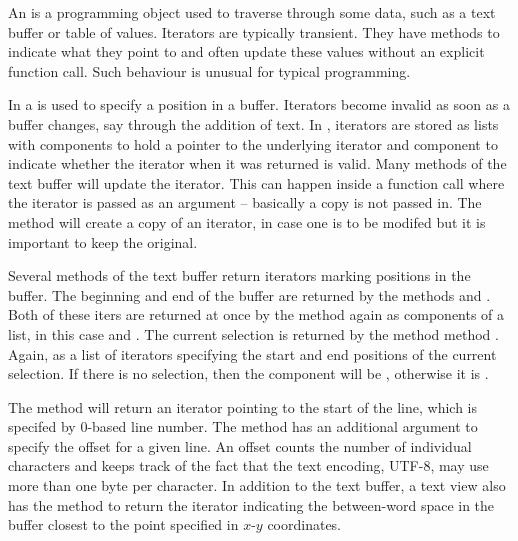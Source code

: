 An  is a programming object used to traverse through
some data, such as a text buffer or table of values. Iterators are
typically transient. They have
methods to indicate what they point to and often update these
values without an explicit function call. Such behaviour is unusual
for typical \R\/ programming.


In \GTK{} a  is used to specify a position in a
buffer. Iterators become invalid as soon as a buffer changes, say
through the addition of text.  In , iterators are stored as
lists with components  to hold a pointer to the underlying
iterator and component  to indicate whether the iterator
when it was returned is valid. Many methods of the text buffer will
update the iterator. This can happen inside a function call where the
iterator is passed as an argument -- basically a copy is not passed
in. The  method will create a copy of an
iterator, in case one is to be modifed but it is important to keep the original.

Several methods of the text buffer return iterators marking positions
in the buffer.  The beginning and end of the buffer are returned by
the methods  and
. Both of these iters are returned
at once by the method  again as
components of a list, in this case  and .  The
current selection is returned by the method method
. Again, as a list of
iterators specifying the start and end positions of the current
selection. If there is no selection, then the component 
will be , otherwise it is .

The method  will return an
iterator pointing to the start of the line, which is specifed by
$0$-based line number. The method
 has an additional argument
to specify the offset for a given line. An offset counts the number of
individual characters and keeps track of the fact that the text
encoding, UTF-8, may use more than one byte per character.  In
addition to the text buffer, a text view also has the method
 to return the iterator
indicating the between-word space in the buffer closest to the point
specified in $x$-$y$ coordinates.

